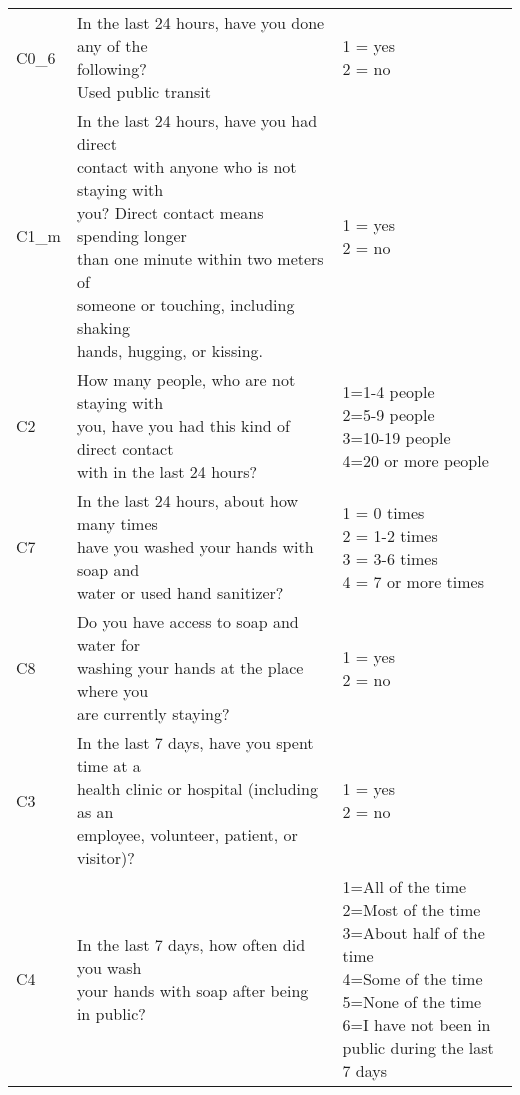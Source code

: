 \begin{tabularx}{\linewidth}{p{1.9cm} <{\RaggedRight}X <{\RaggedRight\arraybackslash}p{4.3cm}}
    C0\_6& \thead{In the last 24 hours, have you done any of the \\following?\\Used public transit} & \thead{1 = yes\\2 = no} \\
    C1\_m& \thead{In the last 24 hours, have you had direct\\ contact with anyone who is not staying with\\ you? Direct contact means spending longer\\ than one minute within two meters of\\ someone or touching, including shaking\\ hands, hugging, or kissing.} & \thead{1 = yes\\2 = no} \\
    C2& \thead{How many people, who are not staying with \\you, have you had this kind of direct contact\\ with in the last 24 hours?} & \thead{1=1-4 people\\2=5-9 people\\3=10-19 people\\4=20 or more people} \\
    C7& \thead{In the last 24 hours, about how many times\\ have you washed your hands with soap and\\ water or used hand sanitizer?} & \thead{1 = 0 times\\2 = 1-2 times\\3 = 3-6 times\\4 = 7 or more times}\\
    C8& \thead{Do you have access to soap and water for\\ washing your hands at the place where you\\ are currently staying?} & \thead{1 = yes\\2 = no} \\
    C3& \thead{In the last 7 days, have you spent time at a\\ health clinic or hospital (including as an\\ employee, volunteer, patient, or visitor)?} & \thead{1 = yes\\2 = no} \\
    C4& \thead{In the last 7 days, how often did you wash\\ your hands with soap after being in public?} & \thead{1=All of the time\\2=Most of the time\\3=About half of the time\\4=Some of the time\\5=None of the time\\6=I have not been in \\public during the last 7 days} \\

\end{tabularx}
